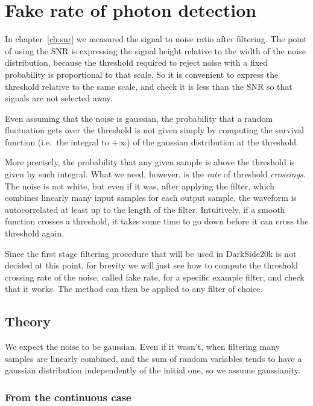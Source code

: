 \chapter{Fake rate of photon detection}

In chapter~\ref{ch:snr} we measured the signal to noise ratio after filtering.
The point of using the SNR is expressing the signal height relative to the
width of the noise distribution, because the threshold required to reject noise
with a fixed probability is proportional to that scale. So it is convenient to
express the threshold relative to the same scale, and check it is less than the
SNR so that signals are not selected away.

Even assuming that the noise is gaussian, the probability that a random
fluctuation gets over the threshold is not given simply by computing the
survival function (i.e.\ the integral to $+\infty$) of the gaussian
distribution at the threshold.

More precisely, the probability that any given sample is above the threshold is
given by such integral. What we need, however, is the \emph{rate} of threshold
\emph{crossings}. The noise is not white, but even if it was, after applying
the filter, which combines linearly many input samples for each output sample,
the waveform is autocorrelated at least up to the length of the filter.
Intuitively, if a smooth function crosses a threshold, it takes some time to go
down before it can cross the threshold again.

Since the first stage filtering procedure that will be used in DarkSide20k is
not decided at this point, for brevity we will just see how to compute the
threshold crossing rate of the noise, called fake rate, for a specific example
filter, and check that it works. The method can then be applied to any filter
of choice.

\section{Theory}

We expect the noise to be gaussian. Even if it wasn't, when filtering many
samples are linearly combined, and the sum of random variables tends to have a
gaussian distribution independently of the initial one, so we assume
gaussianity.

\subsection{From the continuous case}

